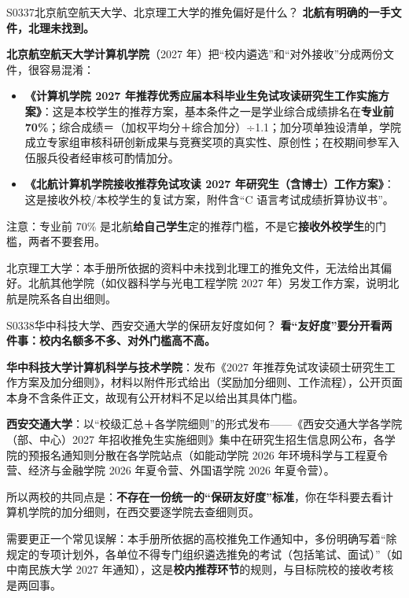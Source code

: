 \begin{qa}{S0337}{北京航空航天大学、北京理工大学的推免偏好是什么？}
\textbf{北航有明确的一手文件，北理未找到。}

\textbf{北京航空航天大学计算机学院}（2027 年）把“校内遴选”和“对外接收”分成两份文件，很容易混淆：

\begin{itemize}
  \item \textbf{《计算机学院 2027 年推荐优秀应届本科毕业生免试攻读研究生工作实施方案》}：这是本校学生的推荐方案，基本条件之一是学业综合成绩排名在\textbf{专业前 70\%}；综合成绩＝（加权平均分＋综合加分）÷1.1；加分项单独设清单，学院成立专家组审核科研创新成果与竞赛奖项的真实性、原创性；在校期间参军入伍服兵役者经审核可酌情加分。
  \item \textbf{《北航计算机学院接收推荐免试攻读 2027 年研究生（含博士）工作方案》}：这是接收外校/本校学生的复试方案，附件含“C 语言考试成绩折算协议书”。
\end{itemize}

注意：专业前 70\% 是北航\textbf{给自己学生}定的推荐门槛，不是它\textbf{接收外校学生}的门槛，两者不要套用。

北京理工大学：本手册所依据的资料中未找到北理工的推免文件，无法给出其偏好。北航其他学院（如仪器科学与光电工程学院 2027 年）另发工作方案，说明北航是院系各自出细则。
\end{qa}

\begin{qa}{S0338}{华中科技大学、西安交通大学的保研友好度如何？}
\textbf{看“友好度”要分开看两件事：校内名额多不多、对外门槛高不高。}

\textbf{华中科技大学计算机科学与技术学院}：发布《2027 年推荐免试攻读硕士研究生工作方案及加分细则》，材料以附件形式给出（奖励加分细则、工作流程），公开页面本身不含条件正文，故现有公开材料不足以给出其具体门槛。

\textbf{西安交通大学}：以“校级汇总＋各学院细则”的形式发布——《西安交通大学各学院（部、中心）2027 年招收推免生实施细则》集中在研究生招生信息网公布，各学院的预报名通知则分散在各学院站点（如能动学院 2026 年环境科学与工程夏令营、经济与金融学院 2026 年夏令营、外国语学院 2026 年夏令营）。

所以两校的共同点是：\textbf{不存在一份统一的“保研友好度”标准}，你在华科要去看计算机学院的加分细则，在西交要逐学院去查细则页。

需要更正一个常见误解：本手册所依据的高校推免工作通知中，多份明确写着“除规定的专项计划外，各单位不得专门组织遴选推免的考试（包括笔试、面试）”（如中南民族大学 2027 年通知），这是\textbf{校内推荐环节}的规则，与目标院校的接收考核是两回事。
\end{qa}

